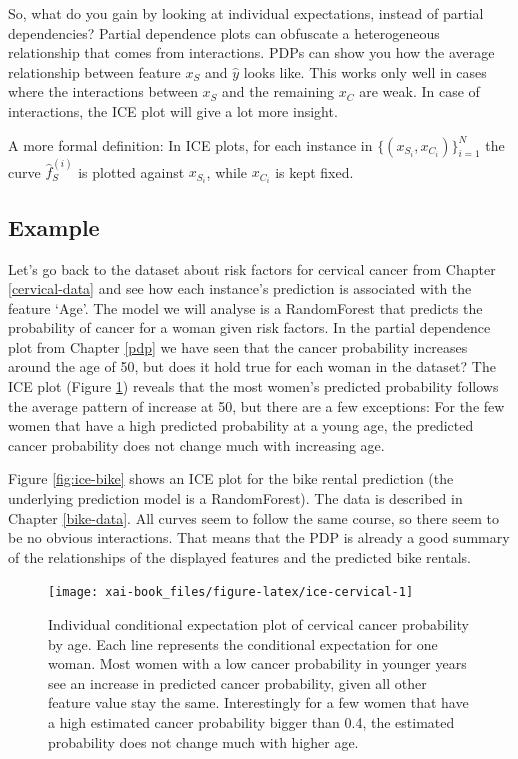 \documentclass[12pt,]{krantz}
\theoremstyle{definition}
\theoremstyle{definition}
\theoremstyle{definition}
\theoremstyle{remark}
\begin{document}
So, what do you gain by looking at individual expectations, instead of
partial dependencies? Partial dependence plots can obfuscate a
heterogeneous relationship that comes from interactions. PDPs can show
you how the average relationship between feature \(x_S\) and \(\hat{y}\)
looks like. This works only well in cases where the interactions between
\(x_S\) and the remaining \(x_C\) are weak. In case of interactions, the
ICE plot will give a lot more insight.

A more formal definition: In ICE plots, for each instance in
\(\{(x_{S_i}, x_{C_i})\}_{i=1}^N\) the curve \(\hat{f}_S^{(i)}\) is
plotted against \(x_{S_i}\), while \(x_{C_i}\) is kept fixed.

\subsection{Example}\label{example-1}

Let's go back to the dataset about risk factors for cervical cancer from
Chapter \ref{cervical-data} and see how each instance's prediction is
associated with the feature `Age'. The model we will analyse is a
RandomForest that predicts the probability of cancer for a woman given
risk factors. In the partial dependence plot from Chapter \ref{pdp} we
have seen that the cancer probability increases around the age of 50,
but does it hold true for each woman in the dataset? The ICE plot
(Figure \ref{fig:ice-cervical}) reveals that the most women's predicted
probability follows the average pattern of increase at 50, but there are
a few exceptions: For the few women that have a high predicted
probability at a young age, the predicted cancer probability does not
change much with increasing age.

Figure \ref{fig:ice-bike} shows an ICE plot for the bike rental
prediction (the underlying prediction model is a RandomForest). The data
is described in Chapter \ref{bike-data}. All curves seem to follow the
same course, so there seem to be no obvious interactions. That means
that the PDP is already a good summary of the relationships of the
displayed features and the predicted bike rentals.

\begin{figure}

{\centering \texttt{[image: xai-book\_files/figure-latex/ice-cervical-1]} 

}

\caption{Individual conditional expectation plot of cervical cancer probability by age. Each line represents the conditional expectation for one woman. Most women with a low cancer probability in younger years see an increase in predicted cancer probability, given all other feature value stay the same. Interestingly for a few women that have a high estimated cancer probability bigger than 0.4, the estimated probability does not change much with higher age.}\label{fig:ice-cervical}
\end{figure}
\end{document}
